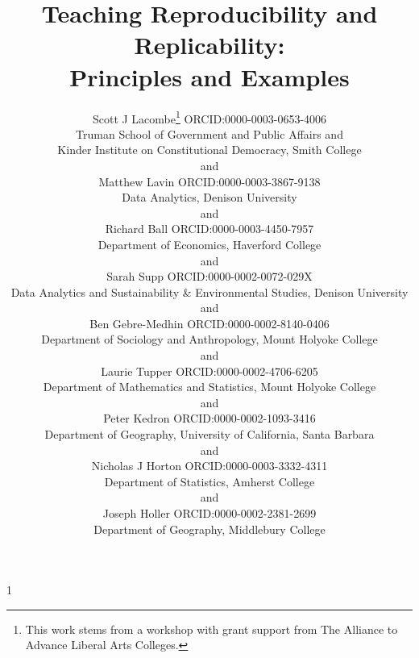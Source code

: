 \documentclass[
  12pt]{article}
\newcommand{\anon}{1}
\begin{document}
\def\spacingset#1{\renewcommand{\baselinestretch}%
{#1}\small\normalsize} \spacingset{1}




\anon
{
  \title{\bf Teaching Reproducibility and Replicability: \\Principles and Examples}
  \author{
  Scott J Lacombe\thanks{This work stems from a workshop with grant support from The Alliance to Advance Liberal Arts Colleges.}\hspace{.2cm} ORCID:0000-0003-0653-4006 \\
Truman School of Government and Public Affairs and \\
Kinder Institute on Constitutional  Democracy, Smith College\\
and\\
Matthew Lavin ORCID:0000-0003-3867-9138\\
Data Analytics, Denison University\\
and\\
Richard Ball ORCID:0000-0003-4450-7957\\
Department of Economics, Haverford College\\
and\\
Sarah Supp ORCID:0000-0002-0072-029X\\
Data Analytics and Sustainability \& Environmental Studies, Denison University\\
and\\
Ben Gebre-Medhin ORCID:0000-0002-8140-0406\\
Department of Sociology and Anthropology, Mount Holyoke College\\
and\\
Laurie Tupper ORCID:0000-0002-4706-6205\\
Department of Mathematics and Statistics, Mount Holyoke College\\
and\\
Peter Kedron ORCID:0000-0002-1093-3416\\
Department of Geography, University of California, Santa Barbara\\
and\\
Nicholas J Horton ORCID:0000-0003-3332-4311\\
Department of Statistics, Amherst College\\
and\\
Joseph Holler ORCID:0000-0002-2381-2699\\
Department of Geography, Middlebury College
}
\maketitle
} \fi
\end{document}
